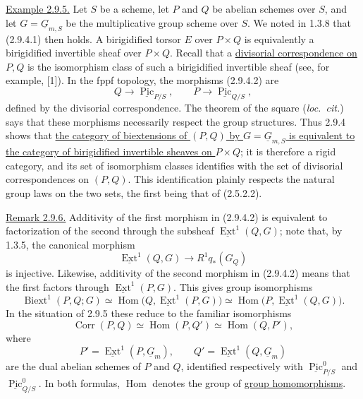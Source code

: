 \underline{Example 2.9.5.} Let $S$ be a scheme, let $P$ and $Q$ be
abelian schemes over $S$, and let $G=\underline G_{m,S}$ be the
multiplicative group scheme over $S$. We noted in 1.3.8 that
(2.9.4.1) then holds. A birigidified torsor $E$ over $P\times Q$ is
equivalently a birigidified invertible sheaf over $P\times Q$. Recall
that a \underline{divisorial correspondence on $P,Q$} is the
isomorphism class of such a birigidified invertible sheaf (see, for
example, [1]). In the fppf topology, the morphisms (2.9.4.2) are
\begin{equation}\tag{2.9.5.1}
 Q\longrightarrow\underline{\operatorname{Pic}}_{P/S},
 \qquad
 P\longrightarrow\underline{\operatorname{Pic}}_{Q/S},
\end{equation}
defined by the divisorial correspondence. The theorem of the square
(\emph{loc.\ cit.}) says that these morphisms necessarily respect the
group structures. Thus 2.9.4 shows that
\underline{the category of biextensions of $(P,Q)$ by
$G=\underline G_{m,S}$ is equivalent to the category of birigidified
invertible sheaves on $P\times Q$}; it is therefore a rigid category,
and its set of isomorphism classes identifies with the set of
divisorial correspondences on $(P,Q)$. This identification plainly
respects the natural group laws on the two sets, the first being that
of (2.5.2.2).

\underline{Remark 2.9.6.} Additivity of the first morphism in
(2.9.4.2) is equivalent to factorization of the second through the
subsheaf $\underline{\operatorname{Ext}}^1(Q,G)$; note that, by 1.3.5,
the canonical morphism
\[
 \underline{\operatorname{Ext}}^1(Q,G)
 \longrightarrow R^1q_*(G_Q)
\]
is injective. Likewise, additivity of the second morphism in
(2.9.4.2) means that the first factors through
$\underline{\operatorname{Ext}}^1(P,G)$. This gives group
isomorphisms
\begin{equation}\tag{2.9.6.1}
 \operatorname{Biext}^{1}(P,Q;G)
 \simeq
 \operatorname{Hom}\bigl(Q,\underline{\operatorname{Ext}}^1(P,G)\bigr)
 \simeq
 \operatorname{Hom}\bigl(P,\underline{\operatorname{Ext}}^1(Q,G)\bigr).
\end{equation}
In the situation of 2.9.5 these reduce to the familiar isomorphisms
\begin{equation}\tag{2.9.6.2}
 \operatorname{Corr}(P,Q)
 \simeq \operatorname{Hom}(P,Q')
 \simeq \operatorname{Hom}(Q,P'),
\end{equation}
where
\[
 P'=\underline{\operatorname{Ext}}^1(P,\underline G_m),
 \qquad
 Q'=\underline{\operatorname{Ext}}^1(Q,\underline G_m)
\]
are the dual abelian schemes of $P$ and $Q$, identified respectively
with $\underline{\operatorname{Pic}}^0_{P/S}$ and
$\underline{\operatorname{Pic}}^0_{Q/S}$. In both formulas,
$\operatorname{Hom}$ denotes the group of \underline{group
homomorphisms}.

